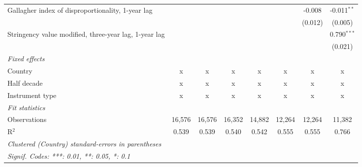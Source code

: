 \begin{table}[htbp]
\begin{tabular}{lccccccc}
      Gallagher index of disproportionality, 1-year lag     &         &         &             &             &               & -0.008        & -0.011$^{**}$\\   
                                                            &         &         &             &             &               & (0.012)       & (0.005)\\   
      Stringency value modified, three-year lag, 1-year lag &         &         &             &             &               &               & 0.790$^{***}$\\   
                                                            &         &         &             &             &               &               & (0.021)\\   
      \emph{Fixed effects}\\
      Country                                               & x       & x       & x           & x           & x             & x             & x\\  
      Half decade                                           & x       & x       & x           & x           & x             & x             & x\\  
      Instrument type                                       & x       & x       & x           & x           & x             & x             & x\\  
      \midrule \emph{Fit statistics}\\
      Observations                                          & 16,576  & 16,576  & 16,352      & 14,882      & 12,264        & 12,264        & 11,382\\  
      R$^2$                                                 & 0.539   & 0.539   & 0.540       & 0.542       & 0.555         & 0.555         & 0.766\\  
      \midrule
      \multicolumn{8}{l}{\emph{Clustered (Country) standard-errors in parentheses}}\\
      \multicolumn{8}{l}{\emph{Signif. Codes: ***: 0.01, **: 0.05, *: 0.1}}\\
   \end{tabular}
\end{table}


